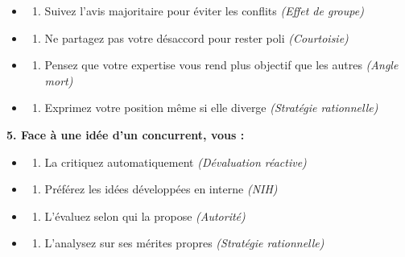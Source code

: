 \documentclass[
]{article}
\providecommand{\tightlist}{%
  \setlength{\itemsep}{0pt}\setlength{\parskip}{0pt}}
\begin{document}
\begin{itemize}
\tightlist
\item
  \begin{enumerate}
  \def\labelenumi{\alph{enumi})}
  \tightlist
  \item
    Suivez l'avis majoritaire pour éviter les conflits \emph{(Effet de
    groupe)}
  \end{enumerate}
\item
  \begin{enumerate}
  \def\labelenumi{\alph{enumi})}
  \setcounter{enumi}{1}
  \tightlist
  \item
    Ne partagez pas votre désaccord pour rester poli \emph{(Courtoisie)}
  \end{enumerate}
\item
  \begin{enumerate}
  \def\labelenumi{\alph{enumi})}
  \setcounter{enumi}{2}
  \tightlist
  \item
    Pensez que votre expertise vous rend plus objectif que les autres
    \emph{(Angle mort)}
  \end{enumerate}
\item
  \begin{enumerate}
  \def\labelenumi{\alph{enumi})}
  \setcounter{enumi}{3}
  \tightlist
  \item
    Exprimez votre position même si elle diverge \emph{(Stratégie
    rationnelle)}
  \end{enumerate}
\end{itemize}

\textbf{5. Face à une idée d'un concurrent, vous :}

\begin{itemize}
\tightlist
\item
  \begin{enumerate}
  \def\labelenumi{\alph{enumi})}
  \tightlist
  \item
    La critiquez automatiquement \emph{(Dévaluation réactive)}
  \end{enumerate}
\item
  \begin{enumerate}
  \def\labelenumi{\alph{enumi})}
  \setcounter{enumi}{1}
  \tightlist
  \item
    Préférez les idées développées en interne \emph{(NIH)}
  \end{enumerate}
\item
  \begin{enumerate}
  \def\labelenumi{\alph{enumi})}
  \setcounter{enumi}{2}
  \tightlist
  \item
    L'évaluez selon qui la propose \emph{(Autorité)}
  \end{enumerate}
\item
  \begin{enumerate}
  \def\labelenumi{\alph{enumi})}
  \setcounter{enumi}{3}
  \tightlist
  \item
    L'analysez sur ses mérites propres \emph{(Stratégie rationnelle)}
  \end{enumerate}
\end{itemize}
\end{document}
